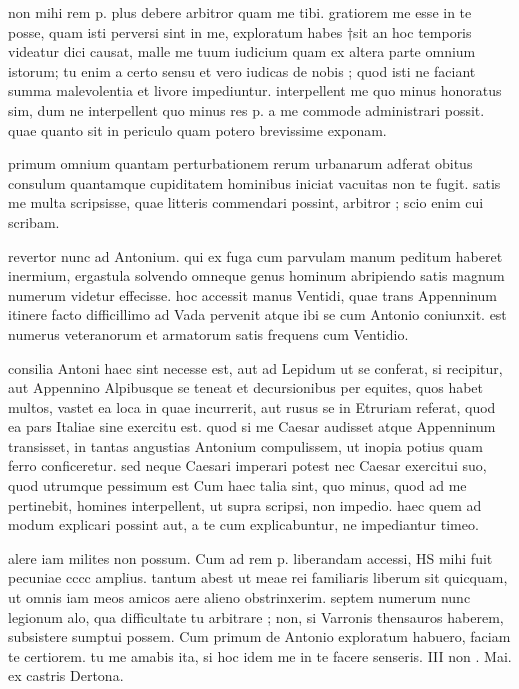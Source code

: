 


 non mihi rem p. plus debere arbitror quam me tibi. gratiorem me esse in te posse, quam isti perversi sint in me, exploratum habes †sit an hoc temporis videatur dici causat, malle me tuum iudicium quam ex altera parte omnium istorum; tu enim a certo sensu et vero iudicas de nobis ; quod isti ne faciant summa malevolentia et livore impediuntur. interpellent me quo minus honoratus sim, dum ne interpellent quo minus res p. a me commode administrari possit. quae quanto sit in periculo quam potero brevissime exponam.

 primum omnium quantam perturbationem rerum urbanarum adferat obitus consulum quantamque cupiditatem hominibus iniciat vacuitas non te fugit. satis me multa scripsisse, quae litteris commendari possint, arbitror ; scio enim cui scribam.

 revertor nunc ad Antonium. qui ex fuga cum parvulam manum peditum haberet inermium, ergastula solvendo omneque genus hominum abripiendo satis magnum numerum videtur effecisse. hoc accessit manus Ventidi, quae trans Appenninum itinere facto difficillimo ad Vada pervenit atque ibi se cum Antonio coniunxit. est numerus veteranorum et armatorum satis frequens cum Ventidio.

 consilia Antoni haec sint necesse est, aut ad Lepidum ut se conferat, si recipitur, aut Appennino Alpibusque se teneat et decursionibus per equites, quos habet multos, vastet ea loca in quae incurrerit, aut rusus se in Etruriam referat, quod ea pars Italiae sine exercitu est. quod si me Caesar audisset atque Appenninum transisset, in tantas angustias Antonium compulissem, ut inopia potius quam ferro conficeretur. sed neque Caesari imperari potest nec Caesar exercitui suo, quod utrumque pessimum est Cum haec talia sint, quo minus, quod ad me pertinebit, homines interpellent, ut supra scripsi, non impedio. haec quem ad modum explicari possint aut, a te cum explicabuntur, ne impediantur timeo.

 alere iam milites non possum. Cum ad rem p. liberandam accessi, HS mihi fuit pecuniae cccc amplius. tantum abest ut meae rei familiaris liberum sit quicquam, ut omnis iam meos amicos aere alieno obstrinxerim. septem numerum nunc legionum alo, qua difficultate tu arbitrare ; non, si Varronis thensauros haberem, subsistere sumptui possem. Cum primum de Antonio exploratum habuero, faciam te certiorem. tu me amabis ita, si hoc idem me in te facere senseris. III non . Mai. ex castris Dertona.
